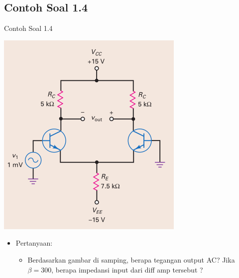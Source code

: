 \documentclass[aspectratio=169]{beamer}
\begin{document}
\subsection{Contoh Soal 1.4}
\begin{frame}{Contoh Soal 1.4}
	\begin{multicols}{2}
		\begin{center}
			\includegraphics[height=0.7\textheight]{gambar/01.contoh_soal_1-2}
		\end{center}
		\columnbreak
		\begin{itemize}
			\item Pertanyaan:
			\begin{itemize}
				\item Berdasarkan gambar di samping, berapa tegangan output AC? Jika $ \beta = 300 $, berapa impedansi input dari diff amp tersebut ?
			\end{itemize}
		\end{itemize}
	\end{multicols}
\end{frame}
\end{document}
